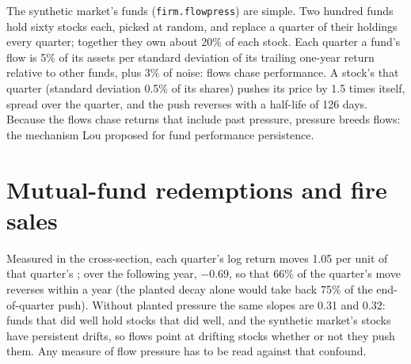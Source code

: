 The synthetic market's funds (\texttt{firm.flowpress}) are simple. Two hundred funds hold sixty stocks each, picked at random, and replace a quarter of their
holdings every quarter; together they own about 20\% of each stock. Each quarter a fund's flow is 5\% of its assets per standard deviation of its trailing
one-year return relative to other funds, plus 3\% of noise: flows chase performance. A stock's  that quarter (standard deviation 0.5\% of
its shares) pushes its price by 1.5 times itself, spread over the quarter, and the push reverses with a half-life of 126 days. Because the flows chase
returns that include past pressure, pressure breeds flows: the mechanism Lou proposed for fund performance persistence.

\section{Mutual-fund redemptions and fire sales}

Measured in the cross-section, each quarter's log return moves 1.05 per unit of that quarter's ; over the following year, $-0.69$, so that
66\% of the quarter's move reverses within a year (the planted decay alone would take back 75\% of the end-of-quarter push). Without planted pressure the
same slopes are 0.31 and 0.32: funds that did well hold stocks that did well, and the synthetic market's stocks have persistent drifts, so flows point at
drifting stocks whether or not they push them. Any measure of flow pressure has to be read against that confound.

\begin{omfigure}

\label{fig:s1:flows:path}
\end{omfigure}


